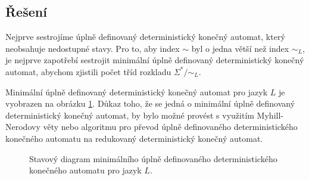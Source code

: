 \documentclass[a4paper, 12pt]{article}
\theoremstyle{definition}
\theoremstyle{definition}
\theoremstyle{definition}
\theoremstyle{remark}
\begin{document}
\subsection{Řešení}
Nejprve sestrojíme úplně definovaný deterministický konečný automat, který neobsahuje nedostupné stavy. Pro to, aby index $\sim$ byl o jedna větší než index $\sim_L$, je nejprve zapotřebí sestrojit minimální úplně definovaný deterministický konečný automat, abychom zjistili počet tříd rozkladu $\Sigma^\ast / \sim_L$.

Minimální úplně definovaný deterministický konečný automat pro jazyk $L$ je vyobrazen na obrázku \ref{fig:minimal}. Důkaz toho, že se jedná o minimální úplně definovaný deterministický konečný automat, by bylo možné provést s využitím Myhill-Nerodovy věty nebo algoritmu pro převod úplně definovaného deterministického konečného automatu na redukovaný deterministický konečný automat.


\begin{figure}[ht!]
    \begin{center}
        \hspace*{0.15\linewidth}    
        
    \caption{Stavový diagram minimálního úplně definovaného deterministického konečného automatu pro jazyk $L$.}
    \label{fig:minimal}
    \end{center}
    \end{figure}
    \FloatBarrier
\end{document}
